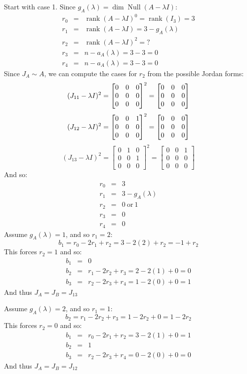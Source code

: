 \documentclass[letterpaper,12pt,fleqn]{article}
\DeclareMathOperator{\rnk}{rank}
\DeclareMathOperator{\Null}{Null}
\renewcommand{\l}{\lambda}
\begin{document}
\begin{enumerate}
\begin{enumerate}
    Start with case 1. Since $g_A(\l)=\dim\Null(A-\l I)$:
    \begin{eqnarray*}
      r_0 &=& \rnk(A-\l I)^0=\rnk(I_3)=3 \\
      r_1 &=& \rnk(A-\l I)=3-g_A(\l) \\
      r_2 &=& \rnk(A-\l I)^2=? \\
      r_3 &=& n-a_A(\l)=3-3=0 \\
      r_4 &=& n-a_A(\l)=3-3=0
    \end{eqnarray*}
    Since $J_A\sim A$, we can compute the cases for $r_2$ from the possible Jordan forms:
    \[(J_{11}-\l I)^2=\JZ^2=\JZ\]
    \[(J_{12}-\l I)^2=
    \begin{bmatrix} 0 & 0 & 1 \\ 0 & 0 & 0 \\ 0 & 0 & 0 \end{bmatrix}^2=\JZ\]
    \[(J_{13}-\l I)^2=
    \begin{bmatrix} 0 & 1 & 0 \\ 0 & 0 & 1 \\ 0 & 0 & 0 \end{bmatrix}^2=
    \begin{bmatrix} 0 & 0 & 1 \\ 0 & 0 & 0 \\ 0 & 0 & 0 \end{bmatrix}\]
    And so:
    \begin{eqnarray*}
      r_0 &=& 3 \\
      r_1 &=& 3-g_A(\l) \\
      r_2 &=& 0\ \mbox{or}\ 1 \\
      r_3 &=& 0 \\
      r_4 &=& 0
    \end{eqnarray*}
    Assume $g_A(\l)=1$, and so $r_1=2$:
    \[b_1=r_0-2r_1+r_2=3-2(2)+r_2=-1+r_2\]
    This forces $r_2=1$ and so:
    \begin{eqnarray*}
      b_1 &=& 0 \\
      b_2 &=& r_1-2r_2+r_3=2-2(1)+0=0 \\
      b_3 &=& r_2-2r_3+r_4=1-2(0)+0=1
    \end{eqnarray*}
    And thus $J_A=J_B=J_{13}$

    Assume $g_A(\l)=2$, and so $r_1=1$:
    \[b_2=r_1-2r_2+r_3=1-2r_2+0=1-2r_2\]
    This forces $r_2=0$ and so:
    \begin{eqnarray*}
      b_1 &=& r_0-2r_1+r_2=3-2(1)+0=1 \\
      b_2 &=& 1 \\
      b_3 &=& r_2-2r_3+r_4=0-2(0)+0=0
    \end{eqnarray*}
    And thus $J_A=J_B=J_{12}$


\end{enumerate}
\end{enumerate}
\end{document}
